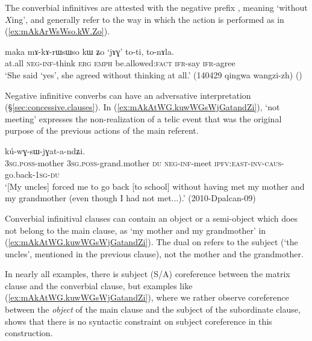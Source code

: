 The converbial infinitives are attested with the negative prefix , meaning `without $X$ing', and generally refer to the way in which the action is performed as in (\ref{ex:mAkArWsWso.kW.Zo}). 

\begin{exe}
\ex \label{ex:mAkArWsWso.kW.Zo}
\gll   maka mɤ-kɤ-rɯsɯso kɯ ʑo `jɤɣ' to-ti, to-nɤla. \\
at.all \textsc{neg}-\textsc{inf}-think \textsc{erg} \textsc{emph} be.allowed:\textsc{fact} \textsc{ifr}-say \textsc{ifr}-agree \\
\glt `She said `yes', she agreed without thinking at all.' (140429 qingwa wangzi-zh)
()
\end{exe}

Negative infinitive converbs can have an adversative interpretation (§\ref{sec:concessive.clauses}). In (\ref{ex:mAkAtWG.kuwWGsWjGatandZi}),   `not meeting' expresses the non-realization of a telic event that was the original purpose of the previous actions of the main referent. 

\begin{exe}
\ex \label{ex:mAkAtWG.kuwWGsWjGatandZi}
\gll [a-mu a-wi ni mɤ-kɤ-ɤtɯɣ] kú-wɣ-sɯ-jɣat-a-ndʑi. \\
\textsc{3sg}.\textsc{poss}-mother \textsc{3sg}.\textsc{poss}-grand.mother \textsc{du} \textsc{neg}-\textsc{inf}-meet \textsc{ipfv}:\textsc{east}-\textsc{inv}-\textsc{caus}-go.back-\textsc{1sg}-\textsc{du} \\
\glt `[My uncles] forced me to go back [to school] without having met my mother and my grandmother (even though I had not met...).' (2010-Dpalcan-09)
\end{exe}

Converbial infinitival clauses can contain an object or a semi-object which does not belong to the main clause, as  `my mother and my grandmother' in (\ref{ex:mAkAtWG.kuwWGsWjGatandZi}). The dual on  refers to the subject (`the uncles', mentioned in the previous clause), not the mother and the grandmother.

In nearly all examples, there is subject (S/A) coreference between the matrix clause and the converbial clause, but examples like (\ref{ex:mAkAtWG.kuwWGsWjGatandZi}), where we rather observe coreference between the \textit{object} of the main clause and the subject of the subordinate clause, shows that there is no syntactic constraint on subject coreference in this construction.

